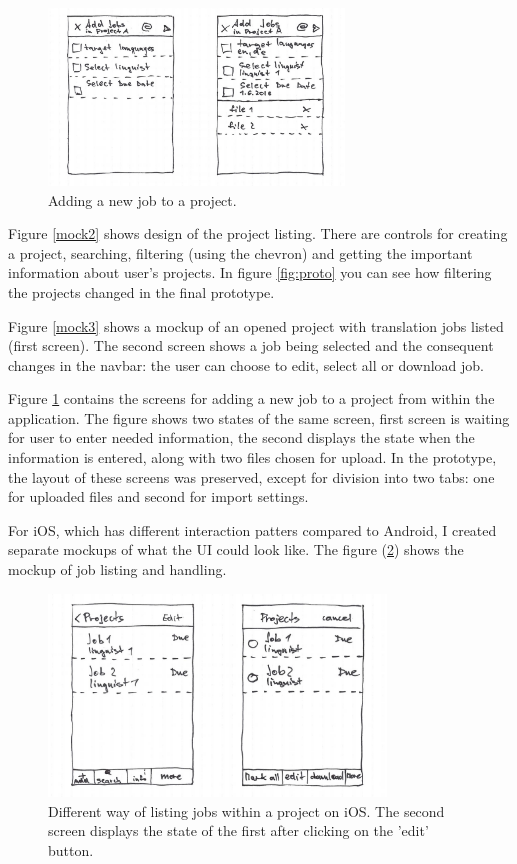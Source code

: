 \begin{figure}[]
	\includegraphics[width=0.7\textwidth]{pics/addJobs}
	\caption{Adding a new job to a project.}
	\label{mock4}
\end{figure}


Figure \ref{mock2} shows design of the project listing. There are controls for creating a project, searching, filtering (using the chevron) and getting the important information about user's projects. In figure \ref{fig:proto} you can see how filtering the projects changed in the final prototype. 

Figure \ref{mock3} shows a mockup of an opened project with translation jobs listed (first screen). The second screen shows a job being selected and the consequent changes in the navbar: the user can choose to edit, select all or download job. 

Figure \ref{mock4} contains the screens for adding a new job to a project from within the application. The figure shows two states of the same screen, first screen is waiting for user to enter needed information, the second displays the state when the information is entered, along with two files chosen for upload. In the prototype, the layout of these screens was preserved, except for division into two tabs: one for uploaded files and second for import settings.



For iOS, which has different interaction patters compared to Android, I created separate mockups of what the UI could look like. The figure (\ref{mock5}) shows the mockup of job listing and handling.

\begin{figure}[]
	\includegraphics[width=0.8\textwidth]{pics/iosProjs2}
	\caption{Different way of listing jobs within a project on iOS. The second screen displays the state of the first after clicking on the 'edit' button.}
	\label{mock5}
\end{figure}



